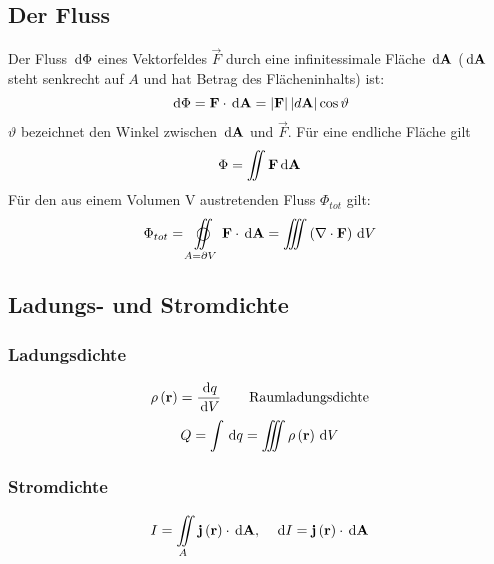 \subsection{Der Fluss}
Der Fluss $\,\mathrm{d} \Phi$ eines Vektorfeldes $\vec{F}$ durch eine infinitessimale Fläche $\,\mathrm{d} \mathbf{A}$ ($\,\mathrm{d} \mathbf{A}$ steht senkrecht auf $A$ und hat Betrag des Flächeninhalts) ist:
\begin{equation}
\,\mathrm{d} \Phi = \mathbf{F} \cdot \,\mathrm{d} \mathbf{A} = \left| \mathbf{F} \right| \left| d \mathbf{A} \right| \cos\vartheta
\end{equation}
$\vartheta$ bezeichnet den Winkel zwischen $\,\mathrm{d} \mathbf{A}$ und $\vec{F}$.
Für eine endliche Fläche gilt 
\begin{equation}
\Phi = \iint \mathbf{F} \,\mathrm{d} \mathbf{A}
\end{equation}
Für den aus einem Volumen V austretenden Fluss $\Phi_{tot}$ gilt:
\begin{equation}
\Phi_{tot} = \varoiint\limits_{A = \partial V} \vec{F} \cdot \d \vec{A} = \iiint \left(\vec{\nabla} \cdot \vec{F} \right) \d V
\end{equation}
\subsection{Ladungs- und Stromdichte}
\subsubsection{Ladungsdichte}
\begin{equation}
\rho \left( \mathbf{r} \right) = \frac{\,\mathrm{d} q}{\,\mathrm{d} V} \qquad \text{Raumladungsdichte}
\end{equation}
\begin{equation}
Q = \int \,\mathrm{d} q = \iiint \rho \left( \mathbf{r} \right) \,\mathrm{d} V
\end{equation}
\subsubsection{Stromdichte}
\begin{equation}
I = \iint\limits_A \mathbf{j} \left( \mathbf{r} \right) \cdot  \,\mathrm{d} \mathbf{A}, \quad \,\mathrm{d} I = \mathbf{j} \left( \mathbf{r} \right) \cdot  \,\mathrm{d} \mathbf{A}
\end{equation}
